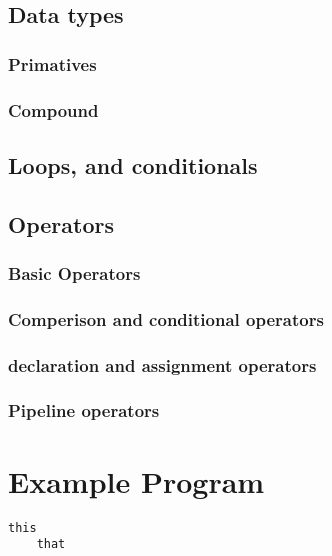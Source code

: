 \documentclass[11pt]{article}
\begin{document}
\subsection{Data types}
\subsubsection{Primatives}
\subsubsection{Compound}
\subsection{Loops, and conditionals}
\subsection{Operators}
\subsubsection{Basic Operators}
\subsubsection{Comperison and conditional operators}
\subsubsection{declaration and assignment operators}
\subsubsection{Pipeline operators}


\section{Example Program}
\begin{lstlisting}
this
	that
\end{lstlisting}

\end{document}
